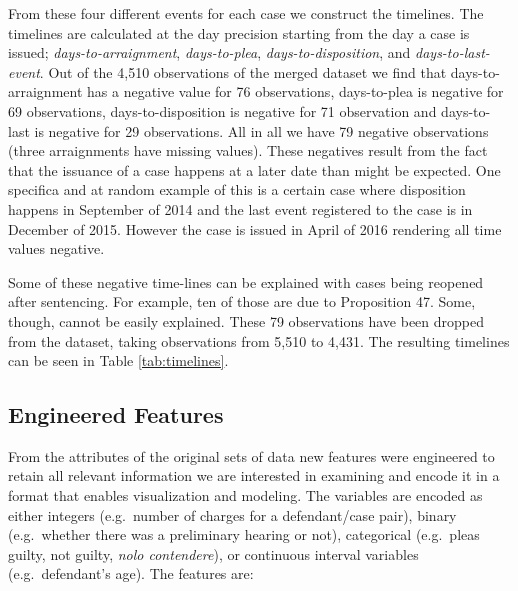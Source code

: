 \documentclass{AISB2008}
\begin{document}
From these four different events for each case we construct the
timelines. The timelines are calculated at the day precision starting
from the day a case is issued; \emph{days-to-arraignment},
\emph{days-to-plea}, \emph{days-to-disposition}, and
\emph{days-to-last-event}. Out of the 4,510 observations of the merged
dataset we find that days-to-arraignment has a negative value for 76
observations, days-to-plea is negative for 69 observations,
days-to-disposition is negative for 71 observation and days-to-last is
negative for 29 observations. All in all we have 79 negative
observations (three arraignments have missing values). These negatives
result from the fact that the issuance of a case happens at a later date
than might be expected. One specifica and at random example of this is a
certain case where disposition happens in September of 2014 and the last
event registered to the case is in December of 2015. However the case is
issued in April of 2016 rendering all time values negative.

Some of these negative time-lines can be explained with cases being
reopened after sentencing. For example, ten of those are due to
Proposition 47. Some, though, cannot be easily explained. These 79
observations have been dropped from the dataset, taking observations
from 5,510 to 4,431. The resulting timelines can be seen in Table
\ref{tab:timelines}.

\subsection{Engineered Features}\label{engineered-features}

From the attributes of the original sets of data new features were
engineered to retain all relevant information we are interested in
examining and encode it in a format that enables visualization and
modeling. The variables are encoded as either integers (e.g.~number of
charges for a defendant/case pair), binary (e.g.~whether there was a
preliminary hearing or not), categorical (e.g.~pleas guilty, not guilty,
\emph{nolo contendere}), or continuous interval variables
(e.g.~defendant's age). The features are:
\end{document}
